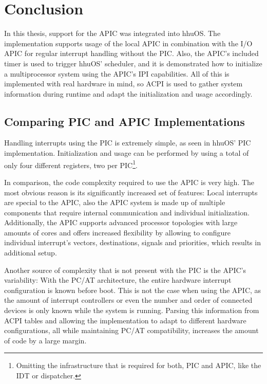 \chapter{Conclusion}
\label{ch:conclusion}

In this thesis, support for the APIC was integrated into hhuOS. The implementation supports usage
of the local APIC in combination with the I/O APIC for regular interrupt handling without the
PIC\@. Also, the APIC's included timer is used to trigger hhuOS' scheduler, and it is demonstrated
how to initialize a multiprocessor system using the APIC's IPI capabilities. All of this is
implemented with real hardware in mind, so ACPI is used to gather system information during runtime
and adapt the initialization and usage accordingly.

\clearpage

\section{Comparing PIC and APIC Implementations}
\label{sec:comparingpicapic}

Handling interrupts using the PIC is extremely simple, as seen in hhuOS' PIC implementation.
Initialization and usage can be performed by using a total of only four different registers, two
per PIC\footnote{Omitting the infrastructure that is required for both, PIC and APIC, like the IDT
  or dispatcher.}.

In comparison, the code complexity required to use the APIC is very high. The most obvious reason
is its significantly increased set of features: Local interrupts are special to the APIC, also the
APIC system is made up of multiple components that require internal communication and individual
initialization. Additionally, the APIC supports advanced processor topologies with large amounts of
cores and offers increased flexibility by allowing to configure individual interrupt's vectors,
destinations, signals and priorities, which results in additional setup.

Another source of complexity that is not present with the PIC is the APIC's variability: With the
PC/AT architecture, the entire hardware interrupt configuration is known before boot. This is not
the case when using the APIC, as the amount of interrupt controllers or even the number and order
of connected devices is only known while the system is running. Parsing this information from ACPI
tables and allowing the implementation to adapt to different hardware configurations, all while
maintaining PC/AT compatibility, increases the amount of code by a large margin.

